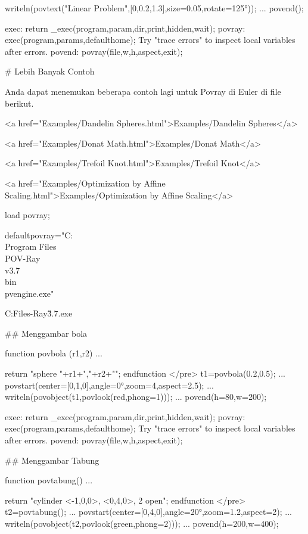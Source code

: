 \documentclass{article}
\begin{document}
\>writeln(povtext("Linear Problem",[0,0.2,1.3],size=0.05,rotate=125°)); ...  
\>   povend();


    exec:
        return _exec(program,param,dir,print,hidden,wait);
    povray:
        exec(program,params,defaulthome);
    Try "trace errors" to inspect local variables after errors.
    povend:
        povray(file,w,h,aspect,exit); 

# Lebih Banyak Contoh

Anda dapat menemukan beberapa contoh lagi untuk Povray di Euler di
file berikut.


  <a href="Examples/Dandelin Spheres.html">Examples/Dandelin Spheres</a>  

  <a href="Examples/Donat Math.html">Examples/Donat Math</a>  

  <a href="Examples/Trefoil Knot.html">Examples/Trefoil Knot</a>  

  <a href="Examples/Optimization by Affine Scaling.html">Examples/Optimization by Affine Scaling</a>  

\>load povray;

\>defaultpovray="C:\\Program Files\\POV-Ray\\v3.7\\bin\\pvengine.exe"


    C:\Program Files\POV-Ray\v3.7\bin\pvengine.exe

## Menggambar bola

\>function povbola (r1,r2) ...


    
    return "sphere {"+r1+","+r2+"}";
    endfunction
</pre>
\>t1=povbola(0.2,0.5); ...  
\>   povstart(center=[0,1,0],angle=0°,zoom=4,aspect=2.5); ...  
\>   writeln(povobject(t1,povlook(red,phong=1))); ...  
\>   povend(h=80,w=200);


    exec:
        return _exec(program,param,dir,print,hidden,wait);
    povray:
        exec(program,params,defaulthome);
    Try "trace errors" to inspect local variables after errors.
    povend:
        povray(file,w,h,aspect,exit); 

## Menggambar Tabung

\>function povtabung() ...


    return "cylinder {<-1,0,0>, <0,4,0>, 2 open}";
    endfunction
</pre>
\>t2=povtabung(); ...  
\>   povstart(center=[0,4,0],angle=20°,zoom=1.2,aspect=2); ...  
\>   writeln(povobject(t2,povlook(green,phong=2))); ...  
\>   povend(h=200,w=400);
\end{document}
